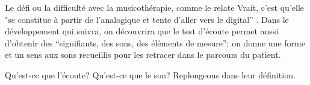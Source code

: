 


 Le défi ou la difficulté avec la musicothérapie, comme le relate Vrait, 
 c'est qu'elle  "se constitue à partir 
 de l'analogique et tente d'aller vers le digital'' 
 \autocite[24]{vrait_musicotherapie_2018}.
Dans le développement qui suivra, on découvrira que le test d'écoute permet aussi d'obtenir des   
\enquote{signifiants, des sons, des éléments de mesure}; on donne
une forme et un sens aux sons recueillis pour les retracer dans le
parcours du patient.



 Qu'est-ce que l'écoute?  Qu'est-ce que le son?
 Replongeons dans leur définition.



